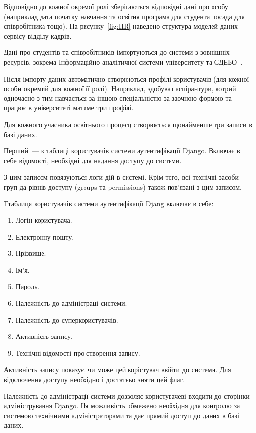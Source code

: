 Відповідно до кожної окремої ролі зберігаються відповідні дані про особу (наприклад дата початку навчання та освітня програма для студента посада для співробітника тощо). На рисунку~\ref{fig:HR} наведено структура моделей даних сервісу відділу кадрів.


Дані про студентів та співробітників імпортуються до системи з зовнішніх ресурсів, зокрема Інформаційно-аналітичної системи університету та ЄДЕБО~\cite{edbo}.

Після імпорту даних автоматично створюються профілі користувачів (для кожної особи окремий для кожної її ролі). Наприклад, здобувач аспірантури, котрий одночасно з тим навчається за іншою спеціальністю за заочною формою та працює в університеті матиме три профілі.

Для кожного учасника освітнього процесц створюється щонайменше три записи в базі даних.

Перший~--- в таблиці користувачів системи аутентифікації Django. Включає в себе відомості, необхідні для надання доступу до системи. 

З цим записом повязуються логи дій в системі. Крім того,  всі технічні засоби груп да рівнів доступу (groups та permissions) також пов'язані з цим записом. 

Ттаблиця користувачів системи аутентифікації Djang включає в себе:
\begin{enumerate}[label={\arabic*.}]
    \item Логін користувача.
    \item Електронну пошту.
    \item Прізвище.
    \item Ім'я.
    \item Пароль.
    \item Належність до адміністраці системи.
    \item Належність до суперкористувачів.
    \item Активність запису.
    \item Технічні відомості про створення запису.
\end{enumerate}

Активність запису показує, чи може цей корістувач ввійти до системи. Для відключення доступу необхідно і достатньо зняти цей флаг. 

Належність до адміністрації системи дозволяє користувачеві входити до сторінки адміністрування Django. Ця можливість обмежено необхідня для контролю за системою технічними адміністраторами та дає прямий доступ до даних в базі даних.

